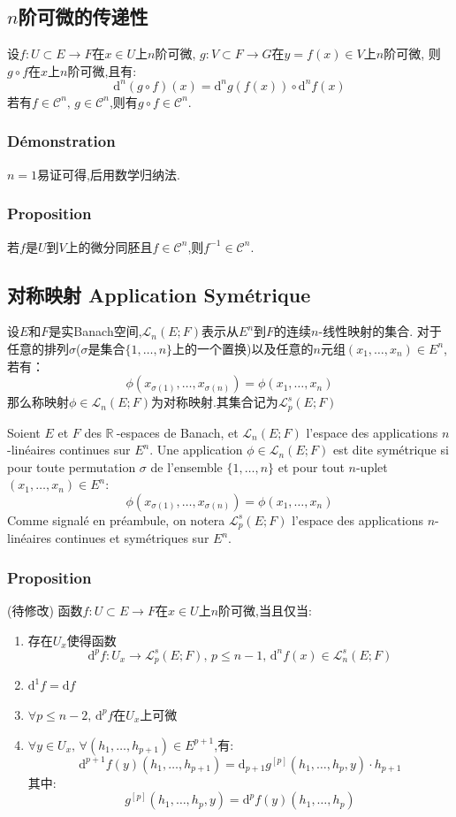 \documentclass[12pt, a4paper, oneside]{ctexbook}
\newcommand{\di }{\text{d}}%
\newcommand{\fuyi }{^{-1}}%
\newcommand{\R }{\mathbb{R}}%
\newcommand{\RR }{$\R\ $}%
\newcommand{\C }{\mathcal{C}}%
\newcommand{\n }{$n$}\newcommand{\f  }{$ f $}
\begin{document}
  \subsection{\n 阶可微的传递性}
  设$f:U\subset E\rightarrow F$在$x\in U$上\n 阶可微,
  $g:V\subset F\rightarrow G$在$y=f(x)\in V$上\n 阶可微,
  则$g\circ f$在$x$上\n 阶可微,且有:
  $$
    \di^n(g\circ f)(x)=\di^n g(f(x))\circ\di^n f(x)
  $$
  若有$f\in\C^n,\,g\in\C^n$,则有$g\circ f\in\C^n$.
  \subsubsection{Démonstration}
  $n=1$易证可得,后用数学归纳法.
  \subsubsection{Proposition}
  若\f 是$U$到$V$上的微分同胚且$f\in\C^n$,则$f\fuyi\in\C^n$.
  \subsection{对称映射 Application Symétrique}
  设$E$和$F$是实Banach空间,$\mathcal{L}_n(E; F)$表示从$E^n$到$F$的连续$n$-线性映射的集合.
  对于任意的排列$\sigma$($\sigma$是集合$\{1,\dots, n\}$上的一个置换)以及任意的$n$元组$(x_1,\dots, x_n) \in E^n$,若有：
  $$
    \phi(x_{\sigma(1)},\dots, x_{\sigma(n)})=\phi(x_1,\dots, x_n)
  $$
  那么称映射$\phi \in \mathcal{L}_n(E; F)$为对称映射.其集合记为$\mathcal{L}_p^s(E; F) $


  \indent
  Soient $E$ et $F$ des \RR-espaces de Banach, et $\mathcal{L}_n(E; F)$ l'espace des applications \n-linéaires continues sur $E^n$. 
  Une application $\phi \in \mathcal{L}_n(E; F)$ est dite symétrique si pour toute permutation $\sigma$ de l'ensemble $\{1,\dots, n\}$ et pour tout \n-uplet $(x_1,\dots, x_n) \in E^n$:
  $$
    \phi(x_{\sigma(1)},\dots, x_{\sigma(n)})=\phi(x_1,\dots, x_n)
  $$
  Comme signalé en préambule, on notera $\mathcal{L}_p^s(E; F) $ l'espace des applications \n-linéaires continues et symétriques sur $E^n$.
  \subsubsection{Proposition}
  (待修改) 函数$f:U\subset E\rightarrow F$在$x\in U$上\n 阶可微,当且仅当:
  \begin{enumerate}
    \item 存在$U_x$使得函数
  $$
    \di^p f:U_x\rightarrow\mathcal{L}_p^s(E; F),\,p\leq n-1,\,\di^nf(x)\in\mathcal{L}_n^s(E; F)
  $$
    \item $\di^1f=\di f$
    \item $\forall p\leq n-2,\,\di^p f$在$U_x$上可微
    \item $\forall y\in U_x,\,\forall(h_1,\dots,h_{p+1})\in E^{p+1}$,有:
  $$
    \di^{p+1}f(y)(h_1,\dots,h_{p+1})=\di_{p+1}g^{[p]}(h_1,\dots,h_p,y)\cdot h_{p+1}
  $$
  其中:
  $$
    g^{[p]}(h_1,\dots,h_p,y)=\di^pf(y)(h_1,\dots,h_p)
  $$
\end{enumerate}
\end{document}
